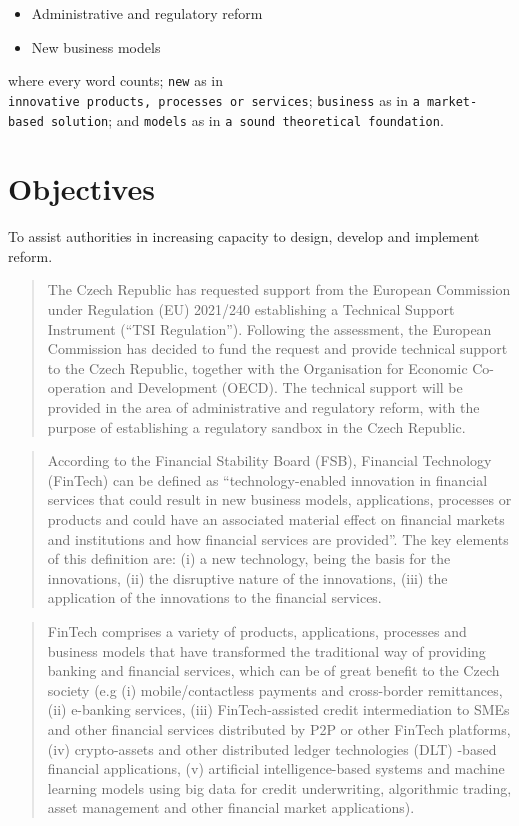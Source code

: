 \documentclass[
]{book}
\begin{document}
\begin{itemize}
\item
  Administrative and regulatory reform
\item
  New business models
\end{itemize}

where every word counts; \texttt{new} as in \texttt{innovative\ products,\ processes\ or\ services}; \texttt{business} as in \texttt{a\ market-based\ solution}; and \texttt{models} as in \texttt{a\ sound\ theoretical\ foundation}.

\hypertarget{objectives}{%
\section{Objectives}\label{objectives}}

To assist authorities in increasing capacity to design, develop and implement reform.

\begin{quote}
The Czech Republic has requested support from the European Commission under Regulation (EU) 2021/240 establishing a Technical Support Instrument (``TSI Regulation'').
Following the assessment, the European Commission has decided to fund the request and provide technical support to the Czech Republic, together with the Organisation for Economic Co-operation and Development (OECD). The technical support will be provided in the area of administrative and regulatory reform, with the purpose of establishing a regulatory sandbox in the Czech Republic.
\end{quote}

\begin{quote}
According to the Financial Stability Board (FSB), Financial Technology (FinTech) can be defined as ``technology-enabled innovation in financial services that could result in new business models, applications, processes or products and could have an associated material effect on financial markets and institutions and how financial services are provided''. The key elements of this definition are: (i) a new technology, being the basis for the innovations, (ii) the disruptive nature of the innovations, (iii) the application of the innovations to the financial services.
\end{quote}

\begin{quote}
FinTech comprises a variety of products, applications, processes and business models that have transformed the traditional way of providing banking and financial services, which can be of great benefit to the Czech society (e.g (i) mobile/contactless payments and cross-border remittances, (ii) e-banking services, (iii) FinTech-assisted credit intermediation to SMEs and other financial services distributed by P2P or other FinTech platforms, (iv) crypto-assets and other distributed ledger technologies (DLT) -based financial applications, (v) artificial intelligence-based systems and machine learning models using big data for credit underwriting, algorithmic trading, asset management and other financial market applications).
\end{quote}
\end{document}
